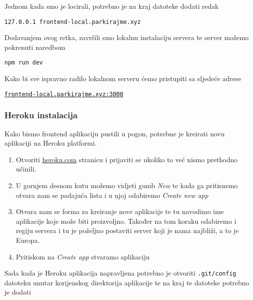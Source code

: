 								Jednom kada smo je locirali, potrebno je na kraj datoteke dodati redak

								\begin{center}
										\texttt{127.0.0.1	frontend-local.parkirajme.xyz}
								\end{center}
								
								Dodavanjem ovog retka, završili smo lokalnu instalaciju servera te server možemo pokrenuti naredbom
								
								\begin{center}
										\texttt{npm run dev}
								\end{center}
								
								Kako bi sve ispravno radilo lokalnom serveru ćemo pristupiti sa sljedeće adrese

								\begin{center}
										\href{http://frontend-local.parkirajme.xyz:3000/}{\texttt{frontend-local.parkirajme.xyz:3000}}
								\end{center}
		             
						\pagebreak
		    
						\subsubsection*{Heroku instalacija}
	        
								Kako bismo frontend aplikaciju pustili u pogon, potrebne je kreirati novu aplikaciji na Heroku platformi.
								
								\begin{enumerate}
									\item Otvoriti \href{https://dashboard.heroku.com/apps}{heroku.com} stranicu i prijaviti se ukoliko to već nismo prethodno učinili.
									\item U gornjem desnom kutu možemo vidjeti gumb \textit{New} te kada ga pritisnemo otvara nam se padajuća lista i u njoj odabiremo \textit{Create new app}
									\item Otvara nam se forma za kreiranje nove aplikacije te tu navodimo ime aplikacije koje može biti proizvoljno. Također na tom koraku odabiremo i regiju servera i tu je poželjno postaviti server koji je nama najbliži, a to je Europa.
									\item Pritiskom na \textit{Create app} stvaramo aplikaciju
		        		\end{enumerate}
		        
		        		Sada kada je Heroku aplikacija napravljena potrebno je otvoriti \texttt{.git/config} datoteku unutar korijenskog direktorija aplikacije te na kraj te datoteke potrebno je dodati

